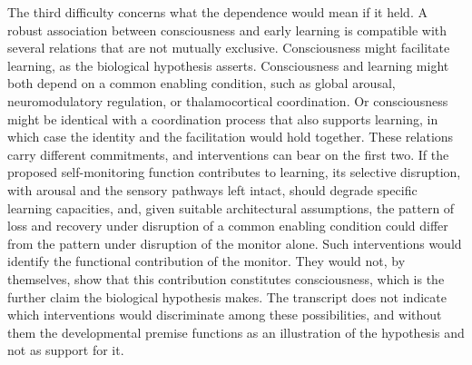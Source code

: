 \documentclass[11pt]{article}
\begin{document}
The third difficulty concerns what the dependence would mean if it held. A robust association between consciousness and early learning is compatible with several relations that are not mutually exclusive. Consciousness might facilitate learning, as the biological hypothesis asserts. Consciousness and learning might both depend on a common enabling condition, such as global arousal, neuromodulatory regulation, or thalamocortical coordination. Or consciousness might be identical with a coordination process that also supports learning, in which case the identity and the facilitation would hold together. These relations carry different commitments, and interventions can bear on the first two. If the proposed self-monitoring function contributes to learning, its selective disruption, with arousal and the sensory pathways left intact, should degrade specific learning capacities, and, given suitable architectural assumptions, the pattern of loss and recovery under disruption of a common enabling condition could differ from the pattern under disruption of the monitor alone. Such interventions would identify the functional contribution of the monitor. They would not, by themselves, show that this contribution constitutes consciousness, which is the further claim the biological hypothesis makes. The transcript does not indicate which interventions would discriminate among these possibilities, and without them the developmental premise functions as an illustration of the hypothesis and not as support for it.
\end{document}
